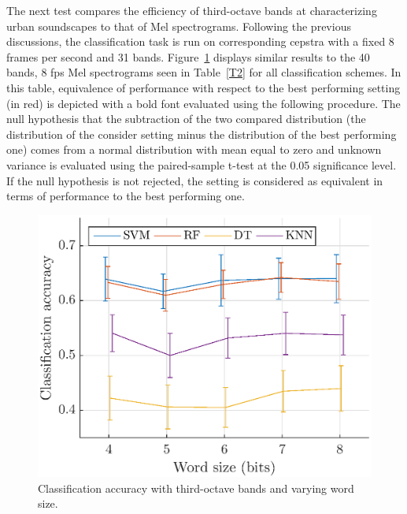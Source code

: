 \documentclass[12pt,times,onecolumn]{article}
\begin{document}
The next test compares the efficiency of third-octave bands at characterizing urban soundscapes to that of Mel spectrograms. Following the previous discussions, the classification task is run on corresponding cepstra with a fixed 8 frames per second and 31 bands. Figure~\ref{fig:class_tob_q} displays similar results to the 40 bands, 8 fps Mel spectrograms seen in Table~\ref{T2} for all classification schemes. In this table, equivalence of performance with respect to the best performing setting (in red) is depicted with a bold font evaluated using the following procedure. The null hypothesis that the subtraction of the two compared distribution (the distribution of the consider setting minus the distribution of the best performing one) comes from a normal distribution with mean equal to zero and unknown variance is evaluated using the paired-sample t-test at the 0.05 significance level. If the null hypothesis is not rejected, the setting is considered as equivalent in terms of performance to the best performing one.\\

\begin{figure}[htbp]
	\centering
		\includegraphics[width=0.7\columnwidth]{figures/class_tob_q.eps}
	\caption{Classification accuracy with third-octave bands and varying word size.}
	\label{fig:class_tob_q}
\end{figure}
\end{document}
